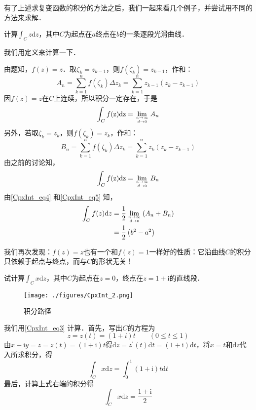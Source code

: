 有了上述求复变函数的积分的方法之后，我们一起来看几个例子，并尝试用不同的方法来求解．
\begin{example}{}
计算$\displaystyle \int _ C z \mathrm dz$，其中$C$为起点在$a$终点在$b$的一条逐段光滑曲线．

我们用定义来计算一下．

由题知，$f(z)=z$．取$\zeta_k=z_{k-1}$，则$f\left(\zeta_{k}\right)=z_{k-1}$，作和：
\begin{equation}
A_{n}=\sum_{k=1}^{n} f\left(\zeta_{k}\right) \Delta z_{k}=\sum_{k=1}^{n} z_{k-1}\left(z_{k}-z_{k-1}\right)
\end{equation}
因$f(z)=z$在$C$上连续，所以积分一定存在，于是
\begin{equation} \label{CpxInt_eq4}
\int_{C} f(\mathrm{z}) \mathrm{d} \mathrm{z}=\lim _{n \rightarrow \infty \atop d \rightarrow 0} A_{n}
\end{equation}
另外，若取$\zeta_k=z_k$，则$f\left(\zeta_{k}\right)=z_{k}$，作和：
\begin{equation}
B_{n}=\sum_{k=1}^{n} f\left(\zeta_{k}\right) \Delta z_{k}=\sum_{k=1}^{n} z_{k}\left(z_{k}-z_{k-1}\right)
\end{equation}
由之前的讨论知，
\begin{equation}\label{CpxInt_eq5}
\int_{C} f(\mathrm{z}) \mathrm{d} \mathrm{z}=\lim _{n \rightarrow \infty \atop d \rightarrow 0} B_{n}
\end{equation}
由\autoref{CpxInt_eq4} 和\autoref{CpxInt_eq5} 知，
\begin{equation}
\begin{aligned} \int_{C} f(z) \mathrm{d} z &=\frac{1}{2} \lim _{n \rightarrow \infty \atop d \rightarrow 0}\left(A_{n}+B_{n}\right) \\ &=\frac{1}{2}\left(b^{2}-a^{2}\right) \end{aligned}
\end{equation}
\end{example}
我们再次发现：$f (z) = z$也有一个和$f(z)=1$一样好的性质：它沿曲线$C$的积分只依赖于起点与终点，而与$C $的形状无关！

\begin{example}{} \label{CpxInt_ex1}
试计算$\displaystyle \int_{C} x \mathrm{d} z$，其中$C$为起点在$z = 0$，终点在$z =1+\mathrm i$的直线段．
\begin{figure}[ht]
\centering
\texttt{[image: ./figures/CpxInt\_2.png]}
\caption{积分路径} \label{CpxInt_fig2}
\end{figure}

我们用\autoref{CpxInt_eq3} 计算．首先，写出$C$的方程为
\begin{equation}
z=z(t)=(1+i) t \qquad (0 \leqslant t \leqslant 1)
\end{equation}
由$x+\mathrm{i} y=z=z(t)=(1+\mathrm{i}) t$得$\mathrm{d} z=z^{\prime}(t) \mathrm{d} t=(1+\mathrm{i}) \mathrm{d} t$，将$x=t$和$\mathrm dz$代入所求积分，得
\begin{equation}
\int_{C} x \mathrm{d} z=\int_{0}^{1}(1+\mathrm{i}) t \mathrm{d} t
\end{equation}
最后，计算上式右端的积分得
\begin{equation}
\int_{C} x \mathrm{d} z=\frac{1+\mathrm{i}}{2}
\end{equation}
\end{example}

